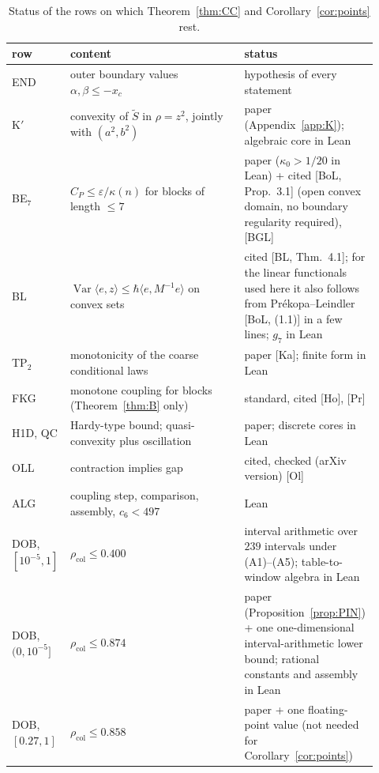 \documentclass[11pt,a4paper]{article}
\theoremstyle{definition}
\theoremstyle{remark}
\newcommand{\Var}{\operatorname{Var}}
\newcommand{\xc}{x_c}
\newcommand{\rcol}{\rho_{\mathrm{col}}}
\begin{document}
\begin{table}[ht]
\centering\small
\begin{tabular}{@{}p{0.13\linewidth}p{0.47\linewidth}p{0.32\linewidth}@{}}
\toprule
row & content & status\\
\midrule
END & outer boundary values $\alpha,\beta\le-\xc$ & hypothesis of every statement\\
K$'$ & convexity of $\tilde S$ in $\rho=z^2$, jointly with $(a^2,b^2)$ & paper (Appendix~\ref{app:K}); algebraic core in Lean\\
BE$_7$ & $C_P\le\varepsilon/\kappa(n)$ for blocks of length $\le7$ & paper ($\kappa_0>1/20$ in Lean) + cited [BoL, Prop.~3.1] (open convex domain, no boundary regularity required), [BGL]\\
BL & $\Var\langle e,z\rangle\le\hbar\langle e,M^{-1}e\rangle$ on convex sets & cited [BL, Thm.~4.1]; for the linear functionals used here it also follows from Pr\'ekopa--Leindler [BoL, (1.1)] in a few lines; $g_7$ in Lean\\
TP$_2$ & monotonicity of the coarse conditional laws & paper [Ka]; finite form in Lean\\
FKG & monotone coupling for blocks (Theorem~\ref{thm:B} only) & standard, cited [Ho], [Pr]\\
H1D, QC & Hardy-type bound; quasi-convexity plus oscillation & paper; discrete cores in Lean\\
OLL & contraction implies gap & cited, checked (arXiv version) [Ol]\\
ALG & coupling step, comparison, assembly, $c_6<497$ & Lean\\
DOB, $[10^{-5},1]$ & $\rcol\le0.400$ & interval arithmetic over $239$ intervals under (A1)--(A5); table-to-window algebra in Lean\\
DOB, $(0,10^{-5}]$ & $\rcol\le0.874$ & paper (Proposition~\ref{prop:PIN}) + one one-dimensional interval-arithmetic lower bound; rational constants and assembly in Lean\\
DOB, $[0.27,1]$ & $\rcol\le0.858$ & paper + one floating-point value (not needed for Corollary~\ref{cor:points})\\
\bottomrule
\end{tabular}
\caption{Status of the rows on which Theorem~\ref{thm:CC} and Corollary~\ref{cor:points} rest.}
\label{tab:status}
\end{table}
\end{document}
